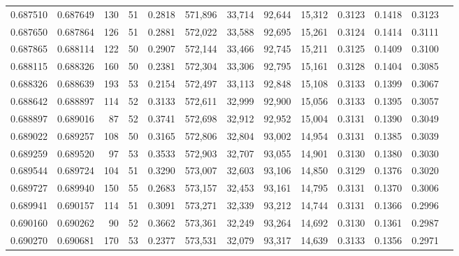 \begin{tabular}{rrrrrrrrrrrrr}
0.687510 & 0.687649 &   130 &  51 &                                     0.2818 & 571,896 &  33,714 &  92,644 &  15,312 & 0.3123 & 0.1418 & 0.3123 \\
0.687650 & 0.687864 &   126 &  51 &                                     0.2881 & 572,022 &  33,588 &  92,695 &  15,261 & 0.3124 & 0.1414 & 0.3111 \\
0.687865 & 0.688114 &   122 &  50 &                                     0.2907 & 572,144 &  33,466 &  92,745 &  15,211 & 0.3125 & 0.1409 & 0.3100 \\
0.688115 & 0.688326 &   160 &  50 &                                     0.2381 & 572,304 &  33,306 &  92,795 &  15,161 & 0.3128 & 0.1404 & 0.3085 \\
0.688326 & 0.688639 &   193 &  53 &                                     0.2154 & 572,497 &  33,113 &  92,848 &  15,108 & 0.3133 & 0.1399 & 0.3067 \\
0.688642 & 0.688897 &   114 &  52 &                                     0.3133 & 572,611 &  32,999 &  92,900 &  15,056 & 0.3133 & 0.1395 & 0.3057 \\
0.688897 & 0.689016 &    87 &  52 &                                     0.3741 & 572,698 &  32,912 &  92,952 &  15,004 & 0.3131 & 0.1390 & 0.3049 \\
0.689022 & 0.689257 &   108 &  50 &                                     0.3165 & 572,806 &  32,804 &  93,002 &  14,954 & 0.3131 & 0.1385 & 0.3039 \\
0.689259 & 0.689520 &    97 &  53 &                                     0.3533 & 572,903 &  32,707 &  93,055 &  14,901 & 0.3130 & 0.1380 & 0.3030 \\
0.689544 & 0.689724 &   104 &  51 &                                     0.3290 & 573,007 &  32,603 &  93,106 &  14,850 & 0.3129 & 0.1376 & 0.3020 \\
0.689727 & 0.689940 &   150 &  55 &                                     0.2683 & 573,157 &  32,453 &  93,161 &  14,795 & 0.3131 & 0.1370 & 0.3006 \\
0.689941 & 0.690157 &   114 &  51 &                                     0.3091 & 573,271 &  32,339 &  93,212 &  14,744 & 0.3131 & 0.1366 & 0.2996 \\
0.690160 & 0.690262 &    90 &  52 &                                     0.3662 & 573,361 &  32,249 &  93,264 &  14,692 & 0.3130 & 0.1361 & 0.2987 \\
0.690270 & 0.690681 &   170 &  53 &                                     0.2377 & 573,531 &  32,079 &  93,317 &  14,639 & 0.3133 & 0.1356 & 0.2971 \\

\end{tabular}

